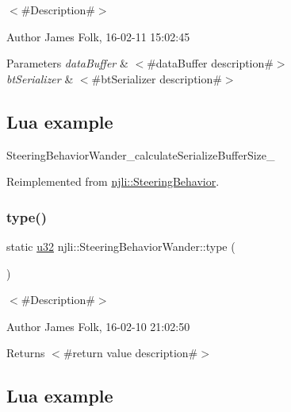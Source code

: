$<$\#\+Description\#$>$ 

\begin{DoxyAuthor}{Author}
James Folk, 16-\/02-\/11 15\+:02\+:45
\end{DoxyAuthor}

\begin{DoxyParams}{Parameters}
{\em data\+Buffer} & $<$\#data\+Buffer description\#$>$ \\
\hline
{\em bt\+Serializer} & $<$\#bt\+Serializer description\#$>$\\
\hline
\end{DoxyParams}
\hypertarget{classnjli_1_1_steering_behavior_wander_ex1}{}\subsection{Lua example}\label{classnjli_1_1_steering_behavior_wander_ex1}

\begin{DoxyCodeInclude}
\end{DoxyCodeInclude}
Steering\+Behavior\+Wander\+\_\+calculate\+Serialize\+Buffer\+Size\+\_\+ 

Reimplemented from \mbox{\hyperlink{classnjli_1_1_steering_behavior_aa8494cb4a327c0040f64cfe8b393786e}{njli\+::\+Steering\+Behavior}}.

\mbox{\label{classnjli_1_1_steering_behavior_wander_a14852ea888647b0acb1a587e9baad28a}} 
\subsubsection{\texorpdfstring{type()}{type()}}
{\footnotesize\ttfamily static \mbox{\hyperlink{_util_8h_a10e94b422ef0c20dcdec20d31a1f5049}{u32}} njli\+::\+Steering\+Behavior\+Wander\+::type (\begin{DoxyParamCaption}{ }\end{DoxyParamCaption})\hspace{0.3cm}{\ttfamily [static]}}



$<$\#\+Description\#$>$ 

\begin{DoxyAuthor}{Author}
James Folk, 16-\/02-\/10 21\+:02\+:50
\end{DoxyAuthor}
\begin{DoxyReturn}{Returns}
$<$\#return value description\#$>$
\end{DoxyReturn}
\hypertarget{classnjli_1_1_steering_behavior_wander_ex1}{}\subsection{Lua example}\label{classnjli_1_1_steering_behavior_wander_ex1}

